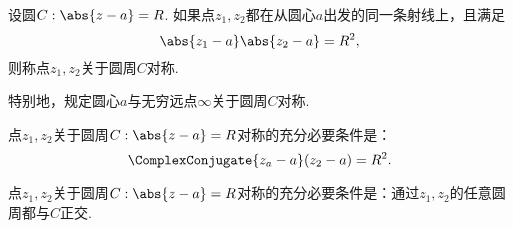 \begin{definition}
设圆\(C: \abs{z - a} = R\).
如果点\(z_1,z_2\)都在从圆心\(a\)出发的同一条射线上，且满足\begin{equation*}
\abs{z_1 - a} \abs{z_2 - a} = R^2,
\end{equation*}则称点\(z_1,z_2\)关于圆周\(C\)对称.

特别地，规定圆心\(a\)与无穷远点\(\infty\)关于圆周\(C\)对称.
\end{definition}

\begin{theorem}
点\(z_1,z_2\)关于圆周\(C: \abs{z - a} = R\)对称的充分必要条件是：\begin{equation*}
\ComplexConjugate{z_a - a} (z_2 - a) = R^2.
\end{equation*}
\end{theorem}

\begin{theorem}
点\(z_1,z_2\)关于圆周\(C: \abs{z - a} = R\)对称的充分必要条件是：通过\(z_1,z_2\)的任意圆周都与\(C\)正交.
\end{theorem}
